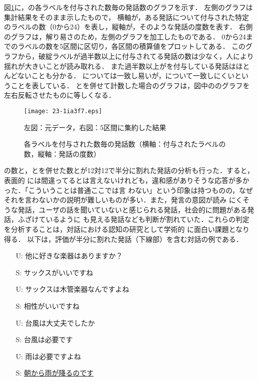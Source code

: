 \documentclass[japanese]{jnlp_1.4}
\newcommand{\maru}{}
\newcommand{\batsu}{}
\newcommand{\sankaku}{}
\begin{document}
図\ref{hist}に，\maru \sankaku \batsu の各ラベルを付与された数毎の発話数のグラフを示す．
左側のグラフは集計結果をそのまま示したもので，
横軸が，ある発話について付与された特定のラベルの数（0から24）を表し，縦軸が，そのような発話の度数を表す．
右側のグラフは，解り易さのため，左側のグラフを加工したものである．
0から24までのラベルの数を5区間に区切り，各区間の積算値をプロットしてある．
このグラフから，破綻ラベル\batsu が過半数以上に付与されてる発話の数は少なく，人により揺れが大きいことが読み取れる．
また過半数以上が\sankaku を付与している発話はほとんどないことも分かる．
\maru については一致し易いが，\sankaku \batsu について一致しにくいということを表している．
\sankaku と\batsu を併せて計数した場合のグラフは，図中の\maru のグラフを左右反転させたものに等しくなる．

\begin{figure}[t]
\begin{center}
\texttt{[image: 23-1ia3f7.eps]}
\end{center}
\caption{各ラベルを付与された数毎の発話数（横軸：付与されたラベルの数，縦軸：発話の度数）}
\begin{center}
\small 左図：元データ，右図：5区間に集約した結果
\end{center}
\label{hist}
\end{figure}

\maru の数と，\sankaku と\batsu を併せた数とが12対12で半分に割れた発話の分析も行った．すると，表面的
には間違ってるとは言えないけれども，違和感がありそうな応答が多かった．「こういうことは普通ここでは言
わない」という印象は持つものの，なぜそれを言わないかの説明が難しいものが多い．また，発言の意図が読み
にくそうな発話，ユーザの話を聞いていないと感じられる発話，社会的に問題がある発話，ふざけているように
も見える発話なども判断が割れていた．これらの判定を分析することは，対話における認知の研究として学術的
に面白い課題となり得る．
以下は，評価が半分に割れた発話（下線部）を含む対話の例である．

\begin{itemize}
\itemsep=-1mm
\item[U:]	他に好きな楽器はありますか？
\item[S:]	サックスがいいですね
\item[U:]	サックスは木管楽器なんですよね
\item[S:]	相性がいいですね
\item[U:]	台風は大丈夫でしたか
\item[S:]	台風は必要です
\item[U:]	雨は必要ですよね
\item[S:]	\underline{朝から雨が降るのです}
\end{itemize}
\end{document}
